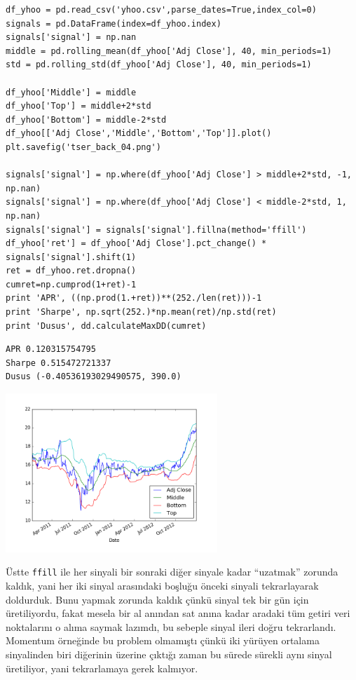 \documentclass[12pt,fleqn]{article}\usepackage{../../common}
\begin{document}
\begin{verbatim}
df_yhoo = pd.read_csv('yhoo.csv',parse_dates=True,index_col=0)
signals = pd.DataFrame(index=df_yhoo.index) 
signals['signal'] = np.nan
middle = pd.rolling_mean(df_yhoo['Adj Close'], 40, min_periods=1) 
std = pd.rolling_std(df_yhoo['Adj Close'], 40, min_periods=1)

df_yhoo['Middle'] = middle
df_yhoo['Top'] = middle+2*std
df_yhoo['Bottom'] = middle-2*std
df_yhoo[['Adj Close','Middle','Bottom','Top']].plot()
plt.savefig('tser_back_04.png')

signals['signal'] = np.where(df_yhoo['Adj Close'] > middle+2*std, -1, np.nan) 
signals['signal'] = np.where(df_yhoo['Adj Close'] < middle-2*std, 1, np.nan)
signals['signal'] = signals['signal'].fillna(method='ffill')
df_yhoo['ret'] = df_yhoo['Adj Close'].pct_change() * signals['signal'].shift(1)
ret = df_yhoo.ret.dropna()
cumret=np.cumprod(1+ret)-1
print 'APR', ((np.prod(1.+ret))**(252./len(ret)))-1
print 'Sharpe', np.sqrt(252.)*np.mean(ret)/np.std(ret)
print 'Dusus', dd.calculateMaxDD(cumret)
\end{verbatim}

\begin{verbatim}
APR 0.120315754795
Sharpe 0.515472721337
Dusus (-0.40536193029490575, 390.0)
\end{verbatim}

\includegraphics[height=6cm]{tser_back_04.png}

Üstte \verb!ffill! ile her sinyali bir sonraki diğer sinyale kadar ``uzatmak''
zorunda kaldık, yani her iki sinyal arasındaki boşluğu önceki sinyali
tekrarlayarak doldurduk. Bunu yapmak zorunda kaldık çünkü sinyal tek bir gün
için üretiliyordu, fakat mesela bir al anından sat anına kadar aradaki tüm
getiri veri noktalarını o alıma saymak lazımdı, bu sebeple sinyal ileri doğru
tekrarlandı. Momentum örneğinde bu problem olmamıştı çünkü iki yürüyen ortalama
sinyalinden biri diğerinin üzerine çıktığı zaman bu sürede sürekli aynı sinyal
üretiliyor, yani tekrarlamaya gerek kalmıyor. 
\end{document}
